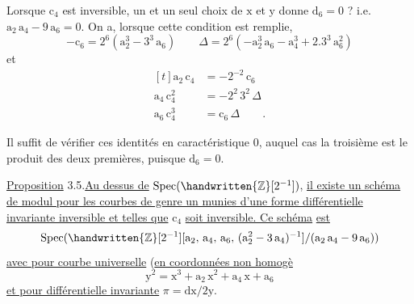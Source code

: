 Lorsque $\mathrm{c}_{4}$ est inversible, un et un seul choix de $\mathrm{x}$ et $\mathrm{y}$ donne $\mathrm{d}_{6}=0$ ? i.e. $\mathrm{a}_{2}\,\mathrm{a}_{4}-9\,\mathrm{a}_{6}=0$. On a, lorsque cette condition est remplie,
\[
-\mathrm{c}_{6}=2^{6}(\mathrm{a}_{2}^{3}-3^{3}\,\mathrm{a}_{6})\qquad
\Delta=2^{6}(-\mathrm{a}_{2}^{3}\,\mathrm{a}_{6}-\mathrm{a}_{4}^{3}+2.3^{3}\,\mathrm{a}_{6}^{2})
\tag*{(3.3)}
\]
et
\[
\begin{aligned}[t]
\mathrm{a}_{2}\,\mathrm{c}_{4}&=-2^{-2}\,\mathrm{c}_{6}\\
\mathrm{a}_{4}\,\mathrm{c}_{4}^{2}&=-2^{2}\,3^{2}\,\Delta\\
\mathrm{a}_{6}\,\mathrm{c}_{4}^{3}&=\mathrm{c}_{6}\,\Delta\qquad.
\end{aligned}
\tag*{(3.4)}
\]

Il suffit de vérifier ces identités en caractéristique $0$, auquel cas la troisième est le produit des deux premières, puisque $\mathrm{d}_{6}=0$.

\uline{Proposition} 3.5.\quad \uline{Au dessus de} $\operatorname{Spec}(\handwritten{\mathbb{Z}}[2^{-1}])$, \uline{il existe un schéma de modul}\uline{ pour les courbes de genre un munies d'une forme différentielle invariante inversible et telles que} $\mathrm{c}_{4}$ \uline{soit inversible. Ce schéma} \reversemarginpar{}\normalmarginpar\uline{est}
\[
\operatorname{Spec}(\handwritten{\mathbb{Z}}[2^{-1}][\mathrm{a}_{2},\,\mathrm{a}_{4},\,\mathrm{a}_{6},\,(\mathrm{a}_{2}^{2}-3\,\mathrm{a}_{4})^{-1}]/(\mathrm{a}_{2}\,\mathrm{a}_{4}-9\,\mathrm{a}_{6}))
\]
\uline{avec pour courbe universelle} (\uline{en coordonnées non homogè}
\[
\mathrm{y}^{2}=\mathrm{x}^{3}+\mathrm{a}_{2}\,\mathrm{x}^{2}+\mathrm{a}_{4}\,\mathrm{x}+\mathrm{a}_{6}
\]
\clearpage
\uline{et pour différentielle invariante} $\pi=\mathrm{dx}/2\mathrm{y}$.

